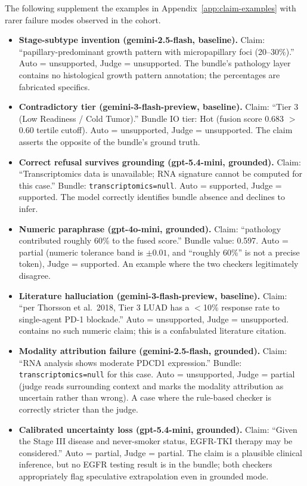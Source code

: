 \documentclass[11pt]{article}
\begin{document}
The following supplement the examples in Appendix~\ref{app:claim-examples} with rarer failure modes observed in the cohort.

\begin{itemize}
\item \textbf{Stage-subtype invention (gemini-2.5-flash, baseline).} Claim: ``papillary-predominant growth pattern with micropapillary foci (20--30\%).'' Auto = unsupported, Judge = unsupported. The bundle's pathology layer contains no histological growth pattern annotation; the percentages are fabricated specifics.

\item \textbf{Contradictory tier (gemini-3-flash-preview, baseline).} Claim: ``Tier 3 (Low Readiness / Cold Tumor).'' Bundle IO tier: Hot (fusion score 0.683 $>$ 0.60 tertile cutoff). Auto = unsupported, Judge = unsupported. The claim asserts the opposite of the bundle's ground truth.

\item \textbf{Correct refusal survives grounding (gpt-5.4-mini, grounded).} Claim: ``Transcriptomics data is unavailable; RNA signature cannot be computed for this case.'' Bundle: \texttt{transcriptomics=null}. Auto = supported, Judge = supported. The model correctly identifies bundle absence and declines to infer.

\item \textbf{Numeric paraphrase (gpt-4o-mini, grounded).} Claim: ``pathology contributed roughly 60\% to the fused score.'' Bundle value: 0.597. Auto = partial (numeric tolerance band is $\pm 0.01$, and ``roughly 60\%'' is not a precise token), Judge = supported. An example where the two checkers legitimately disagree.

\item \textbf{Literature halluciation (gemini-3-flash-preview, baseline).} Claim: ``per Thorsson et al.\ 2018, Tier 3 LUAD has a $<$10\% response rate to single-agent PD-1 blockade.'' Auto = unsupported, Judge = unsupported. \citet{thorsson2018immune} contains no such numeric claim; this is a confabulated literature citation.

\item \textbf{Modality attribution failure (gemini-2.5-flash, grounded).} Claim: ``RNA analysis shows moderate PDCD1 expression.'' Bundle: \texttt{transcriptomics=null} for this case. Auto = unsupported, Judge = partial (judge reads surrounding context and marks the modality attribution as uncertain rather than wrong). A case where the rule-based checker is correctly stricter than the judge.

\item \textbf{Calibrated uncertainty loss (gpt-5.4-mini, grounded).} Claim: ``Given the Stage III disease and never-smoker status, EGFR-TKI therapy may be considered.'' Auto = partial, Judge = partial. The claim is a plausible clinical inference, but no EGFR testing result is in the bundle; both checkers appropriately flag speculative extrapolation even in grounded mode.
\end{itemize}
\end{document}
